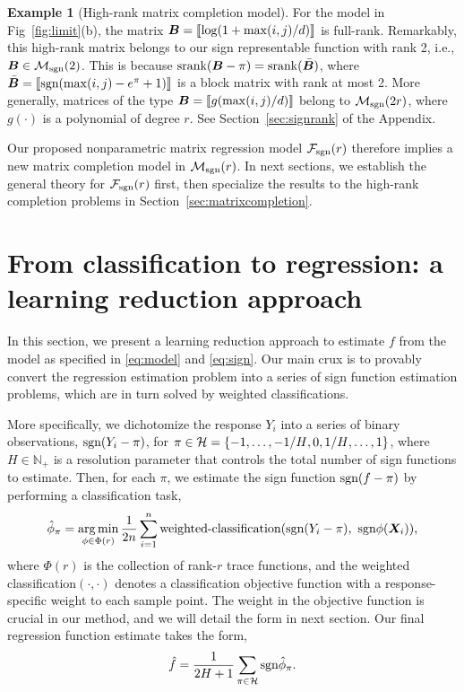 \documentclass[aos]{imsart}
\theoremstyle{definition}
\newtheorem{example}{Example}
\def\sign{\textup{sgn}}
\def\srank{\textup{srank}}
\def\caliF{\tF_{\textup{sgn}}}
\def\caliM{\tM_{\textup{sgn}}}
\begin{document}
\begin{example}[High-rank matrix completion model]\label{ex:high-rank}
For the model in Fig~\ref{fig:limit}(b), the matrix $\bm B=\llbracket \log(1+\max(i,j)/d) \rrbracket$ is full-rank. Remarkably, this high-rank matrix belongs to our sign representable function with rank 2, i.e., $\mB\in \caliM(2)$. This is because $\srank(\mB-\pi)=\srank(\bar \mB)$, where $\bar \mB=\entry{\sign(\max(i,j)-e^\pi+1)}$ is a block matrix with rank at most 2. More generally, matrices of the type $\bm B=\llbracket g(\max(i,j)/d) \rrbracket$ belong to $\caliM(2r)$, where $g(\cdot)$ is a polynomial of degree $r$. See Section~\ref{sec:signrank} of the Appendix.
\end{example}

Our proposed nonparametric matrix regression model $\caliF(r)$ therefore implies a new matrix completion model in $\caliM(r)$. In next sections, we establish the general theory for $\caliF(r)$ first, then specialize the results to the high-rank completion problems in Section~\ref{sec:matrixcompletion}. 





\section{From classification to regression: a learning reduction approach}
\label{sec:bridge}

In this section, we present a learning reduction approach to estimate $f$ from the model as specified in \eqref{eq:model} and \eqref{eq:sign}. Our main crux is to provably convert
the regression estimation problem into a series of sign function estimation problems, which are in turn solved by weighted classifications. 

More specifically, we dichotomize the response $Y_i$ into a series of binary observations, $\sign(Y_i-\pi)$, for $\pi\in\mathcal{H}=\{-1,\ldots,-{1/H}, 0, {1/H}, \ldots,1\}$, where $H\in\mathbb{N}_{+}$ is a resolution parameter that controls the total number of sign functions to estimate. Then, for each $\pi$, we estimate the sign function $\sign(f-\pi)$ by performing a classification task, 
\begin{equation}\label{eq:proposal}
\hat \phi_\pi =\argmin_{\phi\in\Phi(r)}{1\over 2n}\sum_{i=1}^n\text{weighted-classification}(\sign(Y_i-\pi),\ \sign \phi(\mX_i)),
\end{equation}
where $\Phi(r)$ is the collection of rank-$r$ trace functions, and the weighted classification$(\cdot,\cdot)$ denotes a classification objective function with a response-specific weight to each sample point. The weight in the objective function is crucial in our method, and we will detail the form in next section. Our final regression function estimate takes the form, 
\begin{equation}\label{eq:stepfunction}
\hat f= {1\over 2H+1}\sum_{\pi \in \tH} \sign \hat \phi_\pi.
\end{equation}
\end{document}
